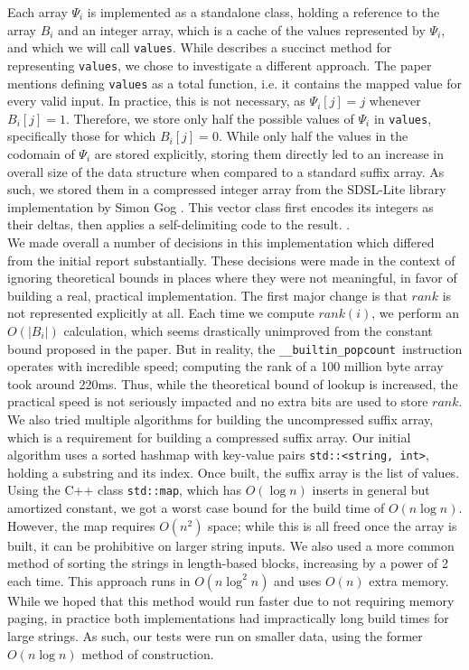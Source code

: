 \documentclass{article}
\newcommand{\popcnt}{\texttt{\_\_builtin\_popcount }}
\begin{document}
\indent Each array $\Psi_i$ is implemented as a standalone class, holding a reference to the array $B_i$ and an integer array, which is a cache of the values represented by $\Psi_i$, and which we will call \texttt{values}. While \cite{GV05} describes a succinct method for representing \texttt{values}, we chose to investigate a different approach. The paper mentions defining \texttt{values} as a total function, i.e. it contains the mapped value for every valid input. In practice, this is not necessary, as $\Psi_i[j] = j$ whenever $B_i[j] = 1$. Therefore, we store only half the possible values of $\Psi_i$ in \texttt{values}, specifically those for which $B_i[j] = 0$. While only half the values in the codomain of $\Psi_i$ are stored explicitly, storing them directly led to an increase in overall size of the data structure when compared to a standard suffix array. As such, we stored them in a compressed integer array from the SDSL-Lite library implementation by Simon Gog \cite{SDSL}. This vector class first encodes its integers as their deltas, then applies a self-delimiting code to the result. \cite{OS07}.\\
\indent We made overall a number of decisions in this implementation which differed from the initial report substantially. These decisions were made in the context of ignoring theoretical bounds in places where they were not meaningful, in favor of building a real, practical implementation. The first major change is that $rank$ is not represented explicitly at all. Each time we compute $rank(i)$, we perform an $O(|B_i|)$ calculation, which seems drastically unimproved from the constant bound proposed in the paper. But in reality, the \popcnt instruction operates with incredible speed; computing the rank of a 100 million byte array took around 220ms. Thus, while the theoretical bound of lookup is increased, the practical speed is not seriously impacted and no extra bits are used to store $rank$.\\
\indent We also tried multiple algorithms for building the uncompressed suffix array, which is a requirement for building a compressed suffix array. Our initial algorithm uses a sorted hashmap with key-value pairs \texttt{std::<string, int>}, holding a substring and its index. Once built, the suffix array is the list of values. Using the C++ class \texttt{std::map}, which has $O(\log n)$ inserts in general but amortized constant, we got a worst case bound for the build time of $O(n\log n)$. However, the map requires $O(n^2)$ space; while this is all freed once the array is built, it can be prohibitive on larger string inputs. We also used a more common method of sorting the strings in length-based blocks, increasing by a power of 2 each time. This approach runs in $O(n \log^2 n)$ and uses $O(n)$ extra memory. While we hoped that this method would run faster due to not requiring memory paging, in practice both implementations had impractically long build times for large strings. As such, our tests were run on smaller data, using the former $O(n\log n)$ method of construction.
\end{document}
